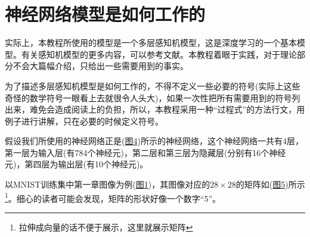 \documentclass[titlepage,UTF8,zihao=-4]{ctexart}
\begin{document}
\section{神经网络模型是如何工作的}
实际上，本教程所使用的模型是一个多层感知机模型，这是深度学习的一个基本模型。有关感知机模型的更多内容，可以参考文献\cite{LH,MN}。本教程着眼于实践，对于理论部分不会大篇幅介绍，只给出一些需要用到的事实。

为了描述多层感知机模型是如何工作的，不得不定义一些必要的符号(实际上这些奇怪的数学符号一眼看上去就很令人头大)，如果一次性把所有需要用到的符号列出来，难免会造成阅读上的负担，所以，本教程采用一种“过程式”的方法行文，用例子进行讲解，只在必要的时候定义符号。

假设我们所使用的神经网络正是(\hyperref[im4]{图4})所示的神经网络，这个神经网络一共有4层，第一层为输入层(有784个神经元)，第二层和第三层为隐藏层(分别有16个神经元)，第四层为输出层(有10个神经元)。

以MNIST训练集中第一章图像为例(\hyperref[im1]{图1})，其图像对应的$28\times28$的矩阵如(\hyperref[matrix]{图5})所示\footnote{拉伸成向量的话不便于展示，这里就展示矩阵}。细心的读者可能会发现，矩阵的形状好像一个数字“5”。
\end{document}

